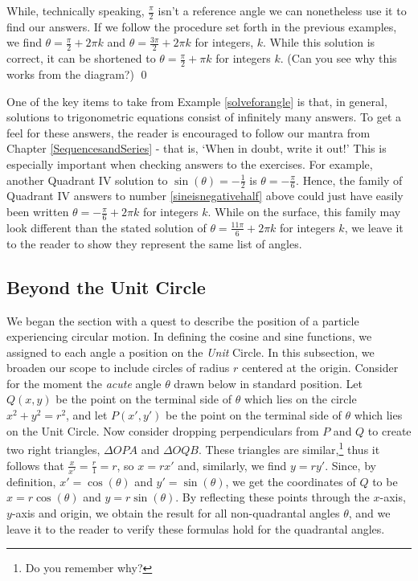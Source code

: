 \begin{ex}
\begin{enumerate}
While, technically speaking, $\frac{\pi}{2}$ isn't a reference angle we can nonetheless use it to find our answers.  If we follow the procedure set forth in the previous examples, we find $\theta = \frac{\pi}{2} + 2\pi k$ and $\theta = \frac{3\pi}{2} + 2\pi k$ for integers, $k$. While this solution is correct, it can be shortened to $\theta = \frac{\pi}{2} + \pi k$ for integers $k$.  (Can you see why this works from the diagram?)  \qed

\end{enumerate}

\end{ex}

One of the key items to take from Example \ref{solveforangle} is that, in general, solutions to trigonometric equations consist of infinitely many answers.  To get a feel for these answers, the reader is encouraged to follow our mantra from Chapter \ref{SequencesandSeries} - that is, `When in doubt, write it out!'   This is especially important when checking answers to the exercises.   For example, another Quadrant IV solution to $\sin(\theta) = -\frac{1}{2}$ is $\theta = -\frac{\pi}{6}$.  Hence, the family of Quadrant IV answers to number \ref{sineisnegativehalf} above could just have easily been written $\theta = -\frac{\pi}{6} + 2\pi k$ for integers $k$.  While on the surface, this family may look different than the stated solution of $\theta = \frac{11\pi}{6} + 2\pi k$ for integers $k$, we leave it to the reader to show they represent the same list of angles.

\subsection{Beyond the Unit Circle}
\label{cosinesinebeyond}

We began the section with a quest to describe the position of a particle experiencing circular motion.  In defining the cosine and sine functions, we assigned to each angle a position on the \textit{Unit} Circle.  In this subsection, we broaden our scope to include circles of radius $r$ centered at the origin.  Consider for the moment the \textit{acute} angle $\theta$ drawn below in standard position.  Let $Q(x,y)$ be the point on the terminal side of $\theta$ which lies on the circle $x^2+y^2 = r^2$, and let $P(x',y')$ be the point on the terminal side of $\theta$ which lies on the Unit Circle.   Now consider dropping perpendiculars from $P$ and $Q$ to create two right triangles, $\Delta OPA$ and $\Delta OQB$. These triangles are similar,\footnote{Do you remember why?} thus it follows that $\frac{x}{x'} = \frac{r}{1} = r$, so $x = r x'$ and, similarly, we find $y = r y'$.  Since, by definition, $x' = \cos(\theta)$ and $y' = \sin(\theta)$,  we get the coordinates of $Q$ to be $x = r \cos(\theta)$ and $y = r \sin(\theta)$.  By reflecting these points through the $x$-axis, $y$-axis and origin, we obtain the result for all non-quadrantal angles $\theta$, and we leave it to the reader to verify these formulas hold for the quadrantal angles.

